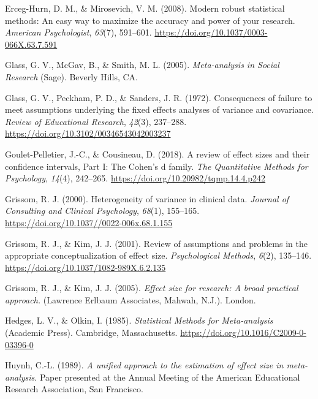 \documentclass[
  english,
  man,floatsintext]{apa6}
\begin{document}
\leavevmode\hypertarget{ref-Erceg-Hurn_Mirosevich_2008}{}%
Erceg-Hurn, D. M., \& Mirosevich, V. M. (2008). Modern robust statistical methods: An easy way to maximize the accuracy and power of your research. \emph{American Psychologist}, \emph{63}(7), 591--601. \url{https://doi.org/10.1037/0003-066X.63.7.591}

\leavevmode\hypertarget{ref-Glass_et_al_1981}{}%
Glass, G. V., McGav, B., \& Smith, M. L. (2005). \emph{Meta-analysis in Social Research} (Sage). Beverly Hills, CA.

\leavevmode\hypertarget{ref-Glass_et_al_1972}{}%
Glass, G. V., Peckham, P. D., \& Sanders, J. R. (1972). Consequences of failure to meet assumptions underlying the fixed effects analyses of variance and covariance. \emph{Review of Educational Research}, \emph{42}(3), 237--288. \url{https://doi.org/10.3102/00346543042003237}

\leavevmode\hypertarget{ref-Pelletier_Cousineau_2018}{}%
Goulet-Pelletier, J.-C., \& Cousineau, D. (2018). A review of effect sizes and their confidence intervals, Part I: The Cohen's d family. \emph{The Quantitative Methods for Psychology}, \emph{14}(4), 242--265. \url{https://doi.org/10.20982/tqmp.14.4.p242}

\leavevmode\hypertarget{ref-Grissom_2000}{}%
Grissom, R. J. (2000). Heterogeneity of variance in clinical data. \emph{Journal of Consulting and Clinical Psychology}, \emph{68}(1), 155--165. \url{https://doi.org/10.1037//0022-006x.68.1.155}

\leavevmode\hypertarget{ref-Grissom_Kim_2001}{}%
Grissom, R. J., \& Kim, J. J. (2001). Review of assumptions and problems in the appropriate conceptualization of effect size. \emph{Psychological Methods}, \emph{6}(2), 135--146. \url{https://doi.org/10.1037/1082-989X.6.2.135}

\leavevmode\hypertarget{ref-Grissom_and_kim_2005}{}%
Grissom, R. J., \& Kim, J. J. (2005). \emph{Effect size for research: A broad practical approach.} (Lawrence Erlbaum Associates, Mahwah, N.J.). London.

\leavevmode\hypertarget{ref-Hedges_Olkin_1985}{}%
Hedges, L. V., \& Olkin, I. (1985). \emph{Statistical Methods for Meta-analysis} (Academic Press). Cambridge, Massachusetts. \url{https://doi.org/10.1016/C2009-0-03396-0}

\leavevmode\hypertarget{ref-Huynh_1989}{}%
Huynh, C.-L. (1989). \emph{A unified approach to the estimation of effect size in meta-analysis}. Paper presented at the Annual Meeting of the American Educational Research Association, San Francisco.
\end{document}
